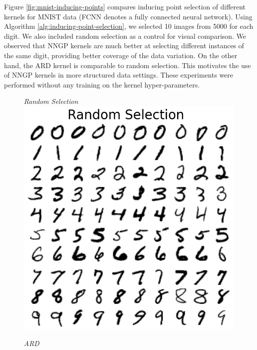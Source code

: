 \documentclass{article}
\numberwithin{equation}{section}
\begin{document}
Figure \ref{fig:mnist-inducing-points} compares inducing point selection of different kernels for MNIST data (FCNN denotes a fully connected neural network). 
Using Algorithm \ref{alg:inducing-point-selection}, we selected 10 images from 5000 for each digit.
We also included random selection as a control for visual comparison.
We observed that NNGP kernels are much better at selecting different instances of the same digit, providing better coverage of the data variation.
On the other hand, the ARD kernel is comparable to random selection. 
This motivates the use of NNGP kernels in more structured data settings.
These experiments were performed without any training on the kernel hyper-parameters.
\begin{figure}[h!]
\small
\centering
\begin{minipage}{.25\textwidth}
  \centering
  \textit{Random Selection}
  \includegraphics[width=\linewidth, trim={0 0 0 1.5cm},clip]{thesis-report/figures/mnist_inducing_point/random_mnist_inducing_point_selection.png}
\end{minipage}%
\begin{minipage}{.25\textwidth}
  \centering
  \textit{ARD}

\end{minipage}
\end{figure}
\end{document}
